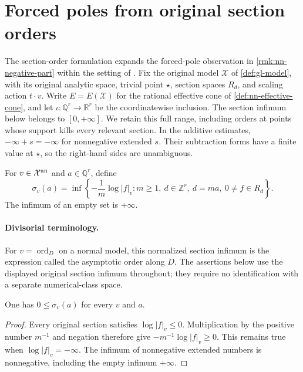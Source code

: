 \section{Forced poles from original section orders}

The section-order formulation expands the forced-pole observation in
\cref{rmk:nn-negative-part} within the setting of \cite{BJ22}.
Fix the original model $\mathcal X$ of \cref{def:gl-model}, with its original
analytic space, trivial point $\star$, section spaces $R_d$, and scaling
action $t\cdot v$.  Write $E=E(\mathcal X)$ for the rational effective cone
of \cref{def:nn-effective-cone}, and let
$\iota:\mathbb Q^r\to\mathbb R^r$ be the coordinatewise inclusion.
The section infimum below belongs to $[0,+\infty]$.  We retain this full
range, including orders at points whose support kills every relevant
section.  In the additive estimates, $-\infty+s=-\infty$ for nonnegative
extended $s$.  Their subtraction forms have a finite value at $\star$,
so the right-hand sides are unambiguous.

\begin{definition}
\label{def:fp-section-order}
\leanok
{}
For $v\in\mathcal X^{\mathrm{an}}$ and $a\in\mathbb Q^r$, define
\[
 \sigma_v(a)=\inf\left\{-\frac1m\log|f|_v:
 m\ge1,\ d\in\mathbb Z^r,\ d=ma,\ 0\ne f\in R_d\right\}.
\]
The infimum of an empty set is $+\infty$.
\end{definition}

\paragraph{Divisorial terminology.}
For $v=\operatorname{ord}_D$ on a normal model, this normalized section
infimum is the expression called the asymptotic order along $D$.
The assertions below use the displayed original section infimum throughout;
they require no identification with a separate numerical-class space.

\begin{lemma}
\label{lem:fp-section-order-nonneg}
\leanok
{}
One has $0\le\sigma_v(a)$ for every $v$ and $a$.
\end{lemma}
\begin{proof}
Every original section satisfies $\log|f|_v\le0$.  Multiplication by
the positive number $m^{-1}$ and negation therefore give
$-m^{-1}\log|f|_v\ge0$.  This remains true when $\log|f|_v=-\infty$.
The infimum of nonnegative extended numbers is nonnegative, including
the empty infimum $+\infty$.
\end{proof}

